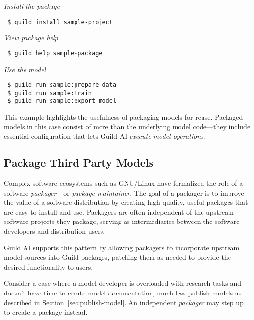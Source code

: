 \documentclass{article}
\begin{document}
\setlength{\parindent}{0.67em}

{\footnotesize\emph{Install the package}}

{\footnotesize
\begin{verbatim}
 $ guild install sample-project
\end{verbatim}}

{\footnotesize\emph{View package help}}

{\footnotesize
\begin{verbatim}
 $ guild help sample-package
\end{verbatim}}

{\footnotesize\emph{Use the model}}

{\footnotesize
\begin{verbatim}
 $ guild run sample:prepare-data
 $ guild run sample:train
 $ guild run sample:export-model
\end{verbatim}}

\setlength{\parindent}{0em}

This example highlights the usefulness of packaging models for
reuse. Packaged models in this case consist of more than the
underlying model code---they include essential configuration that lets
Guild AI \emph{execute model operations}.

\subsection{Package Third Party Models}
\label{sec:package-maintainer}

Complex software ecosystems such as GNU/Linux have formalized the role
of a software \emph{packager}---or \emph{package maintainer}. The goal
of a packager is to improve the value of a software distribution by
creating high quality, useful packages that are easy to install and
use. Packagers are often independent of the upstream software projects
they package, serving as intermediaries between the software
developers and distribution users.

Guild AI supports this pattern by allowing packagers to incorporate
upstream model sources into Guild packages, patching them as needed to
provide the desired functionality to users.

Consider a case where a model developer is overloaded with research
tasks and doesn't have time to create model documentation, much less
publish models as described in Section~\ref{sec:publish-model}. An
independent \emph{packager} may step up to create a package instead.
\end{document}
